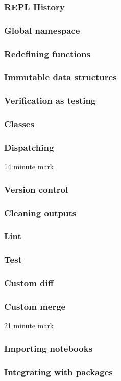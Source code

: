 \begin{frame}
\frametitle{REPL History}
\end{frame}

\begin{frame}
\frametitle{Global namespace}
\end{frame}

\begin{frame}
\frametitle{Redefining functions}
\end{frame}

\begin{frame}
\frametitle{Immutable data structures}
\end{frame}

\begin{frame}
\frametitle{Verification as testing}
\end{frame}

\begin{frame}
\frametitle{Classes}
\end{frame}

\begin{frame}
\frametitle{Dispatching}
\end{frame}

14 minute mark

\begin{frame}
\frametitle{Version control}
\end{frame}

\begin{frame}
\frametitle{Cleaning outputs}
\end{frame}

\begin{frame}
\frametitle{Lint}
\end{frame}

\begin{frame}
\frametitle{Test}
\end{frame}

\begin{frame}
\frametitle{Custom diff}
\end{frame}

\begin{frame}
\frametitle{Custom merge}
\end{frame}

21 minute mark

\begin{frame}
\frametitle{Importing notebooks}
\end{frame}

\begin{frame}
\frametitle{Integrating with packages}
\end{frame}

